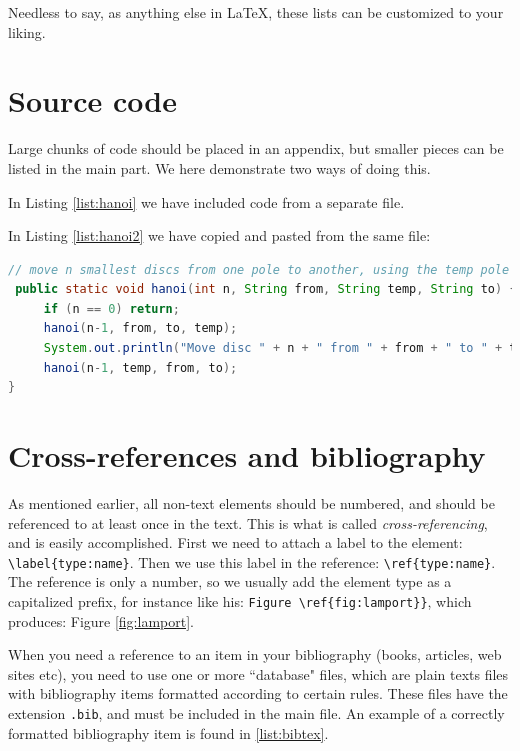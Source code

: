Needless to say, as anything else in \LaTeX, these lists can be customized to your liking.

\section{Source code}
\label{sec:sourcecode} 

Large chunks of code should be placed in an appendix, but smaller pieces can be listed in the main part. We here demonstrate two ways of doing this.

In Listing \ref{list:hanoi} we have included code from a separate file.



In Listing \ref{list:hanoi2} we have copied and pasted from the same file:

\begin{lstlisting}[caption=Core of the recursive solution of Towers in Hanoi,label=list:hanoi2,  language=Java,float=htpb]
// move n smallest discs from one pole to another, using the temp pole
 public static void hanoi(int n, String from, String temp, String to) {
     if (n == 0) return;
     hanoi(n-1, from, to, temp);
     System.out.println("Move disc " + n + " from " + from + " to " + to);
     hanoi(n-1, temp, from, to);
}
\end{lstlisting}



\section{Cross-references and bibliography}

As mentioned earlier, all non-text elements should be numbered, and should be referenced to at least once in the text.
This is what is called {\em cross-referencing}, and is easily accomplished.
First we need to attach a label to the element: \verb|\label{type:name}|. Then we use this label in the reference: \verb|\ref{type:name}|. The reference is only a number, so we usually add the element type as a capitalized prefix, for instance like his: \verb|Figure \ref{fig:lamport}}|, which produces: Figure \ref{fig:lamport}.

When you need a reference to an item in your bibliography (books, articles, web sites etc), you need to use one or more ``database" files, which are plain texts files with bibliography items formatted according to certain rules. These files have the extension {\tt .bib}, and must be included in the main file.
An example of a correctly formatted bibliography item is found in \ref{list:bibtex}.

